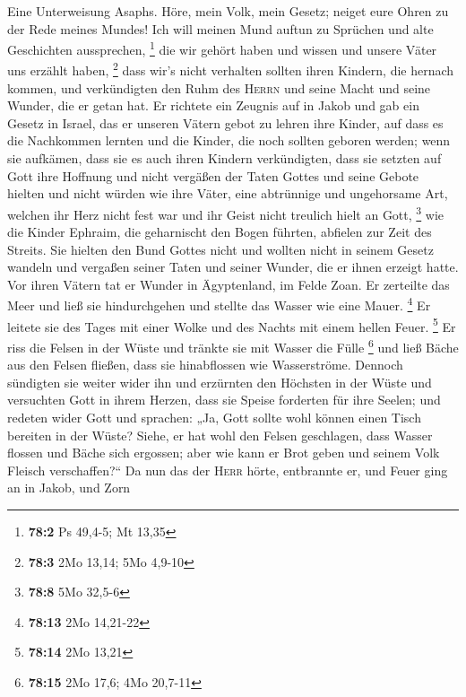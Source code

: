  Eine Unterweisung Asaphs. Höre, mein Volk, mein Gesetz;
neiget eure Ohren zu der Rede meines Mundes!  Ich will
meinen Mund auftun zu Sprüchen und alte Geschichten aussprechen,
\footnote{\textbf{78:2} Ps 49,4-5; Mt 13,35}  die wir
gehört haben und wissen und unsere Väter uns erzählt haben, \footnote{\textbf{78:3}
  2Mo 13,14; 5Mo 4,9-10}  dass wir's nicht verhalten
sollten ihren Kindern, die hernach kommen, und verkündigten den Ruhm des
\textsc{Herrn} und seine Macht und seine Wunder, die er getan hat.
 Er richtete ein Zeugnis auf in Jakob und gab ein Gesetz
in Israel, das er unseren Vätern gebot zu lehren ihre Kinder,
 auf dass es die Nachkommen lernten und die Kinder, die
noch sollten geboren werden; wenn sie aufkämen, dass sie es auch ihren
Kindern verkündigten,  dass sie setzten auf Gott ihre
Hoffnung und nicht vergäßen der Taten Gottes und seine Gebote hielten
 und nicht würden wie ihre Väter, eine abtrünnige und
ungehorsame Art, welchen ihr Herz nicht fest war und ihr Geist nicht
treulich hielt an Gott, \footnote{\textbf{78:8} 5Mo 32,5-6}
 wie die Kinder Ephraim, die geharnischt den Bogen
führten, abfielen zur Zeit des Streits.  Sie hielten den
Bund Gottes nicht und wollten nicht in seinem Gesetz wandeln
 und vergaßen seiner Taten und seiner Wunder, die er
ihnen erzeigt hatte.  Vor ihren Vätern tat er Wunder in
Ägyptenland, im Felde Zoan.  Er zerteilte das Meer und
ließ sie hindurchgehen und stellte das Wasser wie eine Mauer.
\footnote{\textbf{78:13} 2Mo 14,21-22}  Er leitete sie
des Tages mit einer Wolke und des Nachts mit einem hellen Feuer.
\footnote{\textbf{78:14} 2Mo 13,21}  Er riss die Felsen
in der Wüste und tränkte sie mit Wasser die Fülle \footnote{\textbf{78:15}
  2Mo 17,6; 4Mo 20,7-11}  und ließ Bäche aus den Felsen
fließen, dass sie hinabflossen wie Wasserströme.  Dennoch
sündigten sie weiter wider ihn und erzürnten den Höchsten in der Wüste
 und versuchten Gott in ihrem Herzen, dass sie Speise
forderten für ihre Seelen;  und redeten wider Gott und
sprachen: „Ja, Gott sollte wohl können einen Tisch bereiten in der
Wüste?  Siehe, er hat wohl den Felsen geschlagen, dass
Wasser flossen und Bäche sich ergossen; aber wie kann er Brot geben und
seinem Volk Fleisch verschaffen?{}``  Da nun das der
\textsc{Herr} hörte, entbrannte er, und Feuer ging an in Jakob, und Zorn
